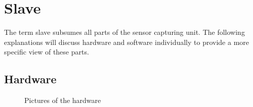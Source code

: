 
\chapter{Slave}

The term slave subsumes all parts of the sensor capturing unit.
The following explanations will discuss hardware and software individually to provide a more specific view of these parts.

\section{Hardware}

\begin{figure}[H]
    \centering
    \qquad
    \qquad
    \caption{Pictures of the hardware}
    \label{view:slave1}
\end{figure}

